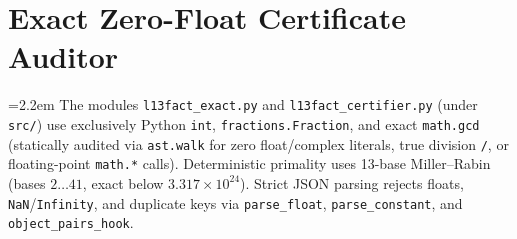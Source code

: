\documentclass[10pt,twocolumn]{article}
\begin{document}
\section{Exact Zero-Float Certificate Auditor}\label{sec:certifier}
{\emergencystretch=2.2em
The modules \texttt{l13fact\_\allowbreak exact.py} and \texttt{l13fact\_\allowbreak certifier.py} (under \texttt{src/}) use exclusively Python \texttt{int}, \texttt{fractions.\allowbreak Fraction}, and exact \texttt{math.\allowbreak gcd} (statically audited via \texttt{ast.walk} for zero float/complex literals, true division \texttt{/}, or floating-point \texttt{math.*} calls). Deterministic primality uses 13-base Miller--Rabin (bases $2\dots 41$, exact below $3.317\times 10^{24}$). Strict JSON parsing rejects floats, \texttt{NaN}/\texttt{Infinity}, and duplicate keys via \texttt{parse\_\allowbreak float}, \texttt{parse\_\allowbreak constant}, and \texttt{object\_\allowbreak pairs\_\allowbreak hook}.

}
\end{document}
